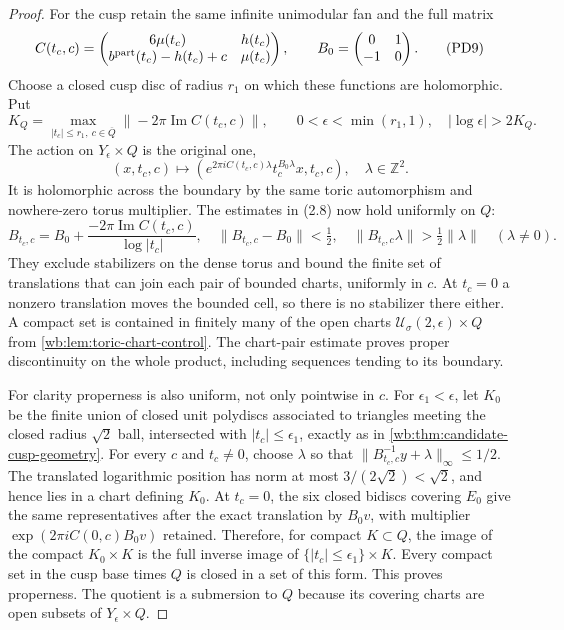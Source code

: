 \begin{proof}
For the cusp retain the same infinite unimodular fan and the full matrix
\[
 C(t_c,c)=
 \begin{pmatrix}6\mu(t_c)&h(t_c)\\
 b^{\rm part}(t_c)-h(t_c)+c&\mu(t_c)
 \end{pmatrix},\qquad
 B_0=\begin{pmatrix}0&1\\-1&0\end{pmatrix}.
 \tag{PD9}
\]
Choose a closed cusp disc of radius $r_1$ on which these functions are
holomorphic. Put
\[
 K_Q=\max_{|t_c|\le r_1,\ c\in\overline Q}
          \|-2\pi\operatorname{Im}C(t_c,c)\|,
 \qquad 0<\epsilon<\min(r_1,1),\quad
          |\log\epsilon|>2K_Q.
 \tag{PD10}
\]
The action on $Y_\epsilon\times Q$ is the original one,
\[
 (x,t_c,c)\longmapsto
 \left(e^{2\pi iC(t_c,c)\lambda}
                  t_c^{B_0\lambda}x,t_c,c\right),
 \quad\lambda\in\mathbb Z^2.
 \tag{PD11}
\]
It is holomorphic across the boundary by the same toric automorphism
and nowhere-zero torus multiplier. The estimates in (2.8) now hold
uniformly on $Q$:
\[
 B_{t_c,c}=B_0+
       \frac{-2\pi\operatorname{Im}C(t_c,c)}{\log|t_c|},\quad
 \|B_{t_c,c}-B_0\|<\tfrac12,\quad
 \|B_{t_c,c}\lambda\|>\tfrac12\|\lambda\|\quad(\lambda\ne0).
 \tag{PD12}
\]
They exclude stabilizers on the dense torus and bound the finite set
of translations that can join each pair of bounded charts, uniformly
in $c$. At $t_c=0$ a nonzero translation moves the bounded cell, so
there is no stabilizer there either. A compact set is contained in finitely
many of the open charts $\mathcal U_\sigma(2,\epsilon)\times Q$ from
\cref{wb:lem:toric-chart-control}.
The chart-pair estimate proves proper discontinuity on the whole
product, including sequences tending to its boundary.

For clarity properness is also uniform, not only pointwise in $c$.
For $\epsilon_1<\epsilon$, let $K_0$ be the finite union of closed
unit polydiscs associated to triangles meeting the closed radius
$\sqrt2$ ball, intersected with $|t_c|\le\epsilon_1$, exactly as in
\cref{wb:thm:candidate-cusp-geometry}. For every $c$ and $t_c\ne0$,
choose $\lambda$ so that
$\|B_{t_c,c}^{-1}y+\lambda\|_\infty\le1/2$.
The translated logarithmic position has norm at most
$3/(2\sqrt2)<\sqrt2$, and hence lies in a chart defining $K_0$.
At $t_c=0$, the six closed bidiscs covering $E_0$ give the same
representatives after the exact translation by $B_0v$, with multiplier
$\exp(2\pi iC(0,c)B_0v)$ retained. Therefore, for compact $K\subset Q$,
the image of the compact $K_0\times K$ is the full inverse image of
$\{|t_c|\le\epsilon_1\}\times K$. Every compact set in the cusp
base times $Q$ is closed in a set of this form. This proves properness.
The quotient is a submersion to $Q$ because its covering charts are
open subsets of $Y_\epsilon\times Q$.


\end{proof}
